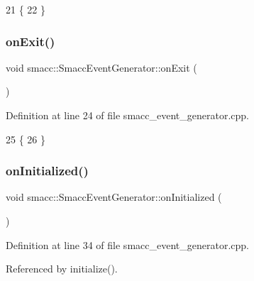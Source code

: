 \begin{DoxyCode}
21     \{
22     \}
\end{DoxyCode}
\mbox{\label{classsmacc_1_1SmaccEventGenerator_ac9de300b5316071623b8486cb5b6662e}} 
\subsubsection{\texorpdfstring{on\+Exit()}{onExit()}}
{\footnotesize\ttfamily void smacc\+::\+Smacc\+Event\+Generator\+::on\+Exit (\begin{DoxyParamCaption}{ }\end{DoxyParamCaption})\hspace{0.3cm}{\ttfamily [virtual]}}



Definition at line 24 of file smacc\+\_\+event\+\_\+generator.\+cpp.


\begin{DoxyCode}
25     \{
26     \}
\end{DoxyCode}
\mbox{\label{classsmacc_1_1SmaccEventGenerator_a59a90d4c22d02f72522e94ff71b14d10}} 
\subsubsection{\texorpdfstring{on\+Initialized()}{onInitialized()}}
{\footnotesize\ttfamily void smacc\+::\+Smacc\+Event\+Generator\+::on\+Initialized (\begin{DoxyParamCaption}{ }\end{DoxyParamCaption})\hspace{0.3cm}{\ttfamily [virtual]}}



Definition at line 34 of file smacc\+\_\+event\+\_\+generator.\+cpp.



Referenced by initialize().


